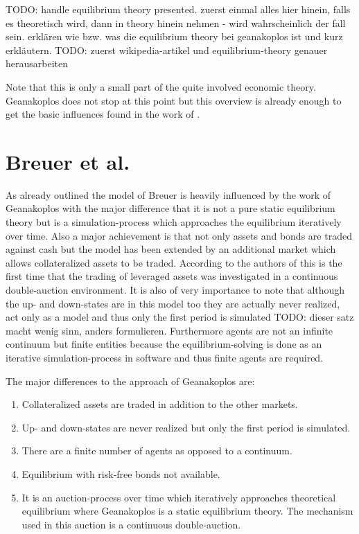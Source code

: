 \documentclass[../Bachelorarbeit.tex]{subfiles}
\begin{document}
\medskip

TODO: handle equilibrium theory presented. zuerst einmal alles hier hinein, falls es theoretisch wird, dann in theory hinein nehmen - wird wahrscheinlich der fall sein.
erklären wie bzw. was die equilibrium theory bei geanakoplos ist und kurz erkläutern.
TODO: zuerst wikipedia-artikel und equilibrium-theory genauer herausarbeiten

\medskip

Note that this is only a small part of the quite involved economic theory. Geanakoplos does not stop at this point but this overview is already enough to get the basic influences found in the work of \cite{Breuer2015}.

\section{Breuer et al.}
As already outlined the model of Breuer is heavily influenced by the work of Geanakoplos with the major difference that it is not a pure static equilibrium theory but is a simulation-process which approaches the equilibrium iteratively over time. Also a major achievement is that not only assets and bonds are traded against cash but the model has been extended by an additional market which allows collateralized assets to be traded. According to the authors of \cite{Breuer2015} this is the first time that the trading of leveraged assets was investigated in a continuous double-auction environment. It is also of very importance to note that although the up- and down-states are in this model too they are actually never realized, act only as a model and thus only the first period is simulated TODO: dieser satz macht wenig sinn, anders formulieren. Furthermore agents are not an infinite continuum but finite entities because the equilibrium-solving is done as an iterative simulation-process in software and thus finite agents are required.

The major differences to the approach of Geanakoplos are:
\begin{enumerate}
\item Collateralized assets are traded in addition to the other markets.
\item Up- and down-states are never realized but only the first period is simulated.
\item There are a finite number of agents as opposed to a continuum.
\item Equilibrium with risk-free bonds not available.
\item It is an auction-process over time which iteratively approaches theoretical equilibrium where Geanakoplos is a static equilibrium theory. The mechanism used in this auction is a continuous double-auction.
\end{enumerate}
\end{document}
